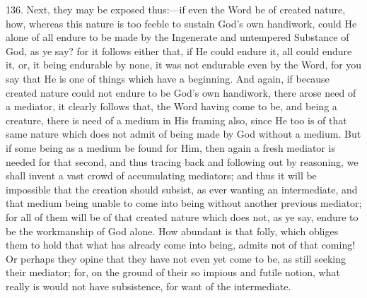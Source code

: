136. Next, they may be exposed
thus:—if even the Word be of created nature, how, whereas this
nature is too feeble to sustain God's own handiwork, could He alone of
all endure to be made by the Ingenerate and untempered Substance of
God, as ye say? for it follows either that, if He could endure it, all
could endure it, or, it being endurable by none, it was not endurable
even by the Word, for you say that He is one of things which have a
beginning. And again, if because created nature could not endure to be
God's own handiwork, there arose need of a mediator, it clearly
follows that, the Word having come to be, and being a creature, there
is need of a medium in His framing also, since He too is of that same
nature which does not admit of being made by God without a medium. But
if some being as a medium be found for Him, then again a fresh
mediator is needed for that second, and thus tracing back and
following out by reasoning, we shall invent a vast crowd of
accumulating mediators; and thus it will be impossible that the
creation should subsist, as ever wanting an intermediate, and that
medium being unable to come into being without another previous
mediator; for all of them will be of that created nature which does
not, as ye say, endure to be the workmanship of God alone. How
abundant is that folly, which obliges them to hold that what has
already come into being, admits not of that coming! Or perhaps they
opine that they have not even yet come to be, as still seeking their
mediator; for, on the ground of their so impious and futile notion,
what really is would not have subsistence, for want of the
intermediate.

